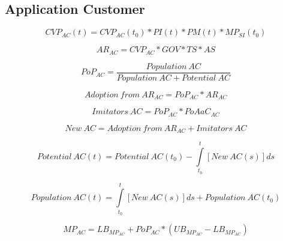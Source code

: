\subsection{Application Customer}\label{ch:app04:csf:ac}

\begin{equation}
		CVP_{AC}(t) =  CVP_{AC}(t_0) * PI(t) * PM(t) * MP_{SI}(t_0)
\end{equation}

\begin{equation}
		AR_{AC} = CVP_{AC} * GOV * TS * AS		
\end{equation}

\begin{equation}
	PoP_{AC} = \frac{\mathit{Population~AC}}{\mathit{Population~AC}+\mathit{Potential~AC}}
\end{equation}

\begin{equation}
	\mathit{Adoption~from~AR_{AC}} = PoP_{AC} * AR_{AC}
\end{equation}

\begin{equation}
	\mathit{Imitators~AC} = PoP_{AC} * PoAaC_{AC}
\end{equation}

\begin{equation}
	\mathit{New~AC} = \mathit{Adoption~from~AR_{AC}} + \mathit{Imitators~AC}
\end{equation}

\begin{equation}
	\mathit{Potential~AC(t)} =\mathit{Potential~AC(t_0)} - \int\limits_{t_0}^t  [\mathit{New~AC}(s)]ds
\end{equation}

\begin{equation}
	\mathit{Population~AC(t)} = \int\limits_{t_0}^t [\mathit{New~AC}(s)]ds + \mathit{Population~AC(t_0)}
\end{equation}

\begin{equation}
	MP_{AC} = LB_{MP_{AC}} + PoP_{AC} * (UB_{MP_{AC}} - LB_{MP_{AC}})
\end{equation}